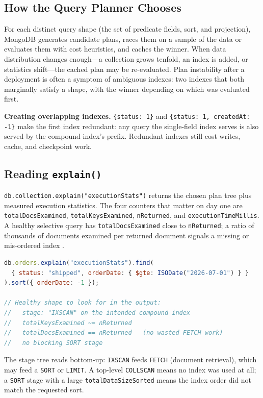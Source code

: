 \subsection{How the Query Planner Chooses}
For each distinct query shape (the set of predicate fields, sort, and projection), MongoDB generates candidate plans, races them on a sample of the data or evaluates them with cost heuristics, and caches the winner. When data distribution changes enough---a collection grows tenfold, an index is added, or statistics shift---the cached plan may be re-evaluated. Plan instability after a deployment is often a symptom of ambiguous indexes: two indexes that both marginally satisfy a shape, with the winner depending on which was evaluated first.

\begin{pitfall}
\textbf{Creating overlapping indexes.} \texttt{\{status: 1\}} and \texttt{\{status: 1, createdAt: -1\}} make the first index redundant: any query the single-field index serves is also served by the compound index's prefix. Redundant indexes still cost writes, cache, and checkpoint work.
\end{pitfall}

\subsection{Reading \texttt{explain()}}
\texttt{db.collection.explain("executionStats")} returns the chosen plan tree plus measured execution statistics. The four counters that matter on day one are \texttt{totalDocsExamined}, \texttt{totalKeysExamined}, \texttt{nReturned}, and \texttt{executionTimeMillis}. A healthy selective query has \texttt{totalDocsExamined} close to \texttt{nReturned}; a ratio of thousands of documents examined per returned document signals a missing or mis-ordered index \cite{mongodbExplainDocs}.

\begin{lstlisting}[language=JavaScript, caption={Proving index usage with execution statistics.}]
db.orders.explain("executionStats").find(
  { status: "shipped", orderDate: { $gte: ISODate("2026-07-01") } }
).sort({ orderDate: -1 });

// Healthy shape to look for in the output:
//   stage: "IXSCAN" on the intended compound index
//   totalKeysExamined ~= nReturned
//   totalDocsExamined == nReturned   (no wasted FETCH work)
//   no blocking SORT stage
\end{lstlisting}

The stage tree reads bottom-up: \texttt{IXSCAN} feeds \texttt{FETCH} (document retrieval), which may feed a \texttt{SORT} or \texttt{LIMIT}. A top-level \texttt{COLLSCAN} means no index was used at all; a \texttt{SORT} stage with a large \texttt{totalDataSizeSorted} means the index order did not match the requested sort.

